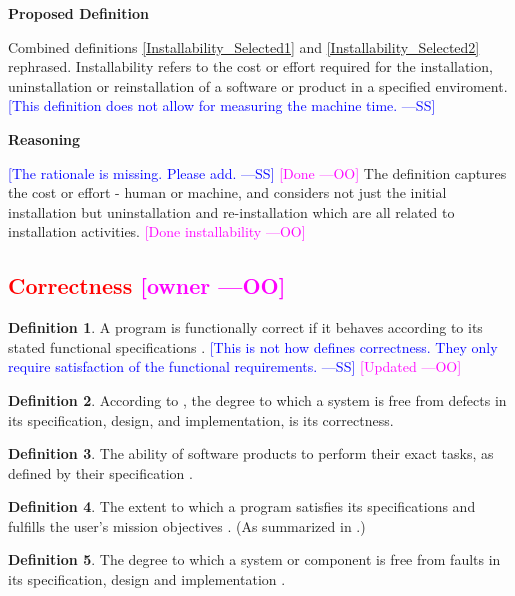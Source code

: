 \documentclass[letterpaper,cleveref]{lipics-v2019}
\newcommand{\authornote}[3]{\textcolor{#1}{[#3 ---#2]}}
\newcommand{\authornote}[3]{}
\newcommand{\wss}[1]{\authornote{blue}{SS}{#1}} %
\newcommand{\oo}[1]{\authornote{magenta}{OO}{#1}} %
\newcommand{\notdone}[1]{\textcolor{red}{#1}}
\theoremstyle{definition}
\newtheorem{defn}{Definition}
\begin{document}
\noindent \textbf{Proposed Definition}

Combined definitions \ref{Installability_Selected1} and
\ref{Installability_Selected2} rephrased.
Installability refers to the cost or effort required for the installation,
uninstallation or reinstallation of a software or product in a specified
enviroment.  \wss{This definition does not allow for
	measuring the machine time.}

\noindent \textbf{Reasoning}

\wss{The rationale is missing.  Please add.} \oo{Done} The definition captures
the cost or effort - human or machine, and considers not just the initial
installation but uninstallation and re-installation which are all related to
installation activities.  \oo{Done installability}

\subsection{\notdone{Correctness} \oo{owner}}

\begin{defn}  
  A program is functionally correct if it behaves according to its stated
  functional specifications \citep{GhezziEtAl2003}.  \wss{This is not how
    \citet{GhezziEtAl2003} defines correctness.  They only require satisfaction
    of the functional requirements.} \oo{Updated}
	
\end{defn}

\begin{defn}
  According to \citet{wilson2009quality}, the degree to which a system is free
  from defects in its specification, design, and implementation, is its
  correctness.
\end{defn}

\begin{defn}
  The ability of software products to perform their exact tasks, as defined by
  their specification \citep{meyer1988object}.
\end{defn}

\begin{defn} 
  The extent to which a program satisfies its specifications and fulfills the
  user's mission objectives \citep{McCallEtAl1977}. (As summarized in
  \citet{VanVliet2000}.)
\end{defn}

\begin{defn} \label{Correctness_Selected} 
  The degree to which a system or component is free from faults in its
  specification, design and implementation \citep{IEEEComputerDictionary1991}.
\end{defn}
\end{document}
